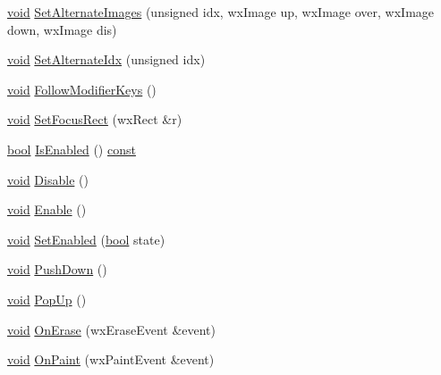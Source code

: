 \begin{DoxyCompactItemize}
\item 
\hyperlink{sound_8c_ae35f5844602719cf66324f4de2a658b3}{void} \hyperlink{class_a_button_aede87ec991655c30378b0ea90305b4e1}{Set\+Alternate\+Images} (unsigned idx, wx\+Image up, wx\+Image over, wx\+Image down, wx\+Image dis)
\item 
\hyperlink{sound_8c_ae35f5844602719cf66324f4de2a658b3}{void} \hyperlink{class_a_button_a5ba29f07a4af182548b7dd71f8514f78}{Set\+Alternate\+Idx} (unsigned idx)
\item 
\hyperlink{sound_8c_ae35f5844602719cf66324f4de2a658b3}{void} \hyperlink{class_a_button_ae7daa64d5211ef3f200ef59ee946e7b3}{Follow\+Modifier\+Keys} ()
\item 
\hyperlink{sound_8c_ae35f5844602719cf66324f4de2a658b3}{void} \hyperlink{class_a_button_ada6347c4b9f467666540a653c655ad66}{Set\+Focus\+Rect} (wx\+Rect \&r)
\item 
\hyperlink{mac_2config_2i386_2lib-src_2libsoxr_2soxr-config_8h_abb452686968e48b67397da5f97445f5b}{bool} \hyperlink{class_a_button_af01ff6051e4d5e3f05362e5dd00727f3}{Is\+Enabled} () \hyperlink{getopt1_8c_a2c212835823e3c54a8ab6d95c652660e}{const} 
\item 
\hyperlink{sound_8c_ae35f5844602719cf66324f4de2a658b3}{void} \hyperlink{class_a_button_a7f9e32cc30168e0f48baca331ac02921}{Disable} ()
\item 
\hyperlink{sound_8c_ae35f5844602719cf66324f4de2a658b3}{void} \hyperlink{class_a_button_a962679543714243f1080938604718d13}{Enable} ()
\item 
\hyperlink{sound_8c_ae35f5844602719cf66324f4de2a658b3}{void} \hyperlink{class_a_button_abacc4df71f91376f2987920c7c980ba1}{Set\+Enabled} (\hyperlink{mac_2config_2i386_2lib-src_2libsoxr_2soxr-config_8h_abb452686968e48b67397da5f97445f5b}{bool} state)
\item 
\hyperlink{sound_8c_ae35f5844602719cf66324f4de2a658b3}{void} \hyperlink{class_a_button_a3125107c4a795e909efd8ffeb3ee2ceb}{Push\+Down} ()
\item 
\hyperlink{sound_8c_ae35f5844602719cf66324f4de2a658b3}{void} \hyperlink{class_a_button_a97a1a5fb6b2b7dc302398335241d3dad}{Pop\+Up} ()
\item 
\hyperlink{sound_8c_ae35f5844602719cf66324f4de2a658b3}{void} \hyperlink{class_a_button_a79c74ddc1dac62737c76e63ce63bd885}{On\+Erase} (wx\+Erase\+Event \&event)
\item 
\hyperlink{sound_8c_ae35f5844602719cf66324f4de2a658b3}{void} \hyperlink{class_a_button_a5cab2e11b286343d2f65da1482169140}{On\+Paint} (wx\+Paint\+Event \&event)

\end{DoxyCompactItemize}
